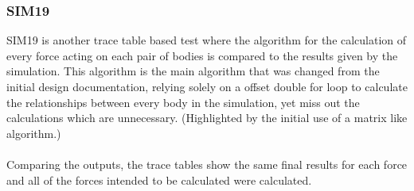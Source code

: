 \pagebreak

\subsubsection{SIM19}
SIM19 is another trace table based test where the algorithm for the calculation of every force acting on each pair of bodies is compared to the results given by the simulation. This algorithm is the main algorithm that was changed from the initial design documentation, relying solely on a offset double for loop to calculate the relationships between every body in the simulation, yet miss out the calculations which are unnecessary. (Highlighted by the initial use of a matrix like algorithm.)

\paragraph{}
Comparing the outputs, the trace tables show the same final results for each force and all of the forces intended to be calculated were calculated.

